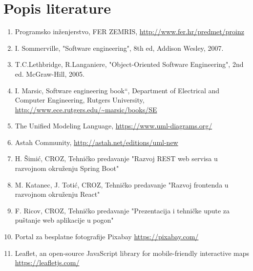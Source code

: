 \chapter*{Popis literature}


		\begin{enumerate}


			\item  Programsko inženjerstvo, FER ZEMRIS, \url{http://www.fer.hr/predmet/proinz}

			\item  I. Sommerville, "Software engineering", 8th ed, Addison Wesley, 2007.

			\item  T.C.Lethbridge, R.Langaniere, "Object-Oriented Software Engineering", 2nd ed. McGraw-Hill, 2005.

			\item  I. Marsic, Software engineering book``, Department of Electrical and Computer Engineering, Rutgers University, \url{http://www.ece.rutgers.edu/~marsic/books/SE}

			\item  The Unified Modeling Language, \url{https://www.uml-diagrams.org/}

			\item  Astah Community, \url{http://astah.net/editions/uml-new}

			\item  H. Šimić, CROZ, Tehničko predavanje "Razvoj REST web servisa u razvojnom okruženju Spring Boot"

			\item  M. Katanec, J. Totić, CROZ, Tehničko predavanje "Razvoj frontenda u razvojnom okruženju React"

			\item  F. Ricov, CROZ, Tehničko predavanje "Prezentacija i tehničke upute za puštanje web aplikacije u pogon"

			\item  Portal za besplatne fotografije Pixabay \url{https://pixabay.com/}

			\item  Leaflet, an open-source JavaScript library for mobile-friendly interactive maps \url{https://leafletjs.com/}

		\end{enumerate}
